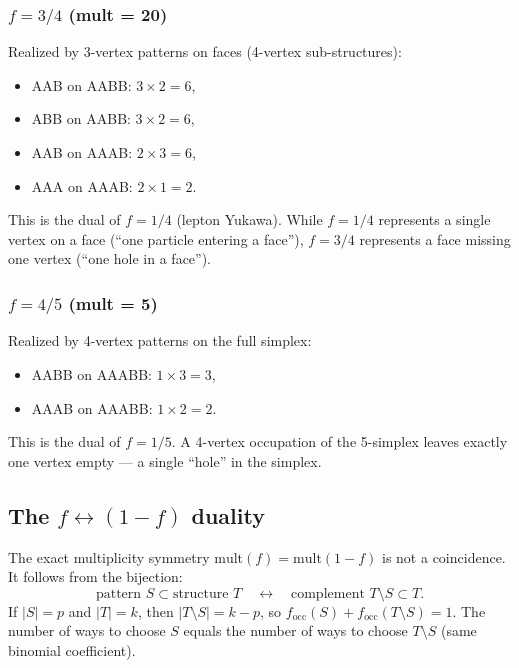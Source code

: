 \documentclass[12pt]{article}
\theoremstyle{remark}
\theoremstyle{definition}
\begin{document}
\subsubsection{$f = 3/4$ (mult = 20)}

Realized by 3-vertex patterns on faces (4-vertex sub-structures):
\begin{itemize}
\item AAB on AABB: $3 \times 2 = 6$,
\item ABB on AABB: $3 \times 2 = 6$,
\item AAB on AAAB: $2 \times 3 = 6$,
\item AAA on AAAB: $2 \times 1 = 2$.
\end{itemize}
This is the dual of $f = 1/4$ (lepton Yukawa).  While $f = 1/4$ represents a single vertex on a face (``one particle entering a face''), $f = 3/4$ represents a face missing one vertex (``one hole in a face'').

\subsubsection{$f = 4/5$ (mult = 5)}

Realized by 4-vertex patterns on the full simplex:
\begin{itemize}
\item AABB on AAABB: $1 \times 3 = 3$,
\item AAAB on AAABB: $1 \times 2 = 2$.
\end{itemize}
This is the dual of $f = 1/5$.  A 4-vertex occupation of the 5-simplex leaves exactly one vertex empty --- a single ``hole'' in the simplex.

\subsection{The $f \leftrightarrow (1-f)$ duality}
\label{sec:f_duality}

The exact multiplicity symmetry $\mathrm{mult}(f) = \mathrm{mult}(1-f)$ is not a coincidence.  It follows from the bijection:
\begin{equation}
\text{pattern } S \subset \text{structure } T \quad \longleftrightarrow \quad \text{complement } T \setminus S \subset T.
\end{equation}
If $|S| = p$ and $|T| = k$, then $|T \setminus S| = k - p$, so $f_\mathrm{occ}(S) + f_\mathrm{occ}(T \setminus S) = 1$.  The number of ways to choose $S$ equals the number of ways to choose $T \setminus S$ (same binomial coefficient).
\end{document}
